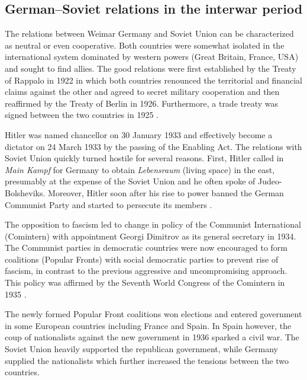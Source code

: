 \subsection{German–Soviet relations in the interwar period}
The relations between Weimar Germany and Soviet Union can be characterized as neutral or even cooperative. Both countries were somewhat isolated in the international system dominated by western powers (Great Britain, France, USA) and sought to find allies. The good relations were first established by the Treaty of Rappalo in 1922 in which both countries renounced the territorial and financial claims against the other and agreed to secret military cooperation \citep{gatzke_russo-german_1958} and then reaffirmed by the Treaty of Berlin in 1926. Furthermore, a trade treaty was signed between the two countries in 1925 \citep{morgan_political_1963}.

Hitler was named chancellor on 30 January 1933 and effectively become a dictator on 24 March 1933 by the passing of the Enabling Act. 
The relations with Soviet Union quickly turned hostile for several reasons.  First, Hitler called in \emph{Main Kampf} for Germany to obtain \emph{Lebensraum} (living space) in the east, presumably at the expense of the Soviet Union and he often spoke of Judeo-Bolsheviks. Moreover, Hitler soon after his rise to power banned the German Communist Party and started to persecute its members  \citep{haslam_soviet_1984}. 

The opposition to fascism led to change in policy of the Communist International (Comintern)  with appointment Georgi Dimitrov as  its general secretary in 1934. The Communist parties in democratic countries were now encouraged to form coalitions (Popular Fronts) with social democratic parties to prevent rise of fascism, in contrast to the previous aggressive and uncompromising approach. This policy was affirmed by the Seventh World Congress of the Comintern in 1935 \citep{haslam_comintern_1979}.

The newly formed Popular Front coalitions won elections and entered government in some European countries including France and Spain. In Spain however, the coup of nationalists against the new government in 1936 sparked a civil war. The Soviet Union heavily supported the republican government, while Germany supplied the nationalists which further increased the tensions between the two countries. 

